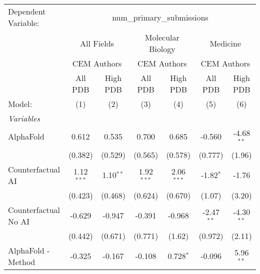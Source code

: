 \begingroup
\centering
\begin{tabular}{lcccccc}
   \tabularnewline \midrule \midrule
   Dependent Variable: & \multicolumn{6}{c}{num\_primary\_submissions}\\
 & \multicolumn{2}{c}{All Fields} & \multicolumn{2}{c}{Molecular Biology} & \multicolumn{2}{c}{Medicine} \\
\cmidrule(lr){2-3} \cmidrule(lr){4-5} \cmidrule(lr){6-7}
 & \multicolumn{2}{c}{CEM Authors} & \multicolumn{2}{c}{CEM Authors} & \multicolumn{2}{c}{CEM Authors} \\
\cmidrule(lr){2-3} \cmidrule(lr){4-5} \cmidrule(lr){6-7}
 & \multicolumn{1}{c}{All PDB} & \multicolumn{1}{c}{High PDB} & \multicolumn{1}{c}{All PDB} & \multicolumn{1}{c}{High PDB} & \multicolumn{1}{c}{All PDB} & \multicolumn{1}{c}{High PDB} \\
\cmidrule(lr){2-2} \cmidrule(lr){3-3} \cmidrule(lr){4-4} \cmidrule(lr){5-5} \cmidrule(lr){6-6} \cmidrule(lr){7-7}
   Model:                                                     & (1)           & (2)           & (3)           & (4)           & (5)          & (6)\\  
   \midrule
   \emph{Variables}\\
   AlphaFold                                                  & 0.612         & 0.535         & 0.700         & 0.685         & -0.560       & -4.68$^{**}$\\   
                                                              & (0.382)       & (0.529)       & (0.565)       & (0.578)       & (0.777)      & (1.96)\\   
   Counterfactual AI                                          & 1.12$^{***}$  & 1.10$^{**}$   & 1.92$^{***}$  & 2.06$^{***}$  & -1.82$^{*}$  & -1.76\\   
                                                              & (0.423)       & (0.468)       & (0.624)       & (0.670)       & (1.07)       & (3.20)\\   
   Counterfactual No AI                                       & -0.629        & -0.947        & -0.391        & -0.968        & -2.47$^{**}$ & -4.30$^{**}$\\   
                                                              & (0.442)       & (0.671)       & (0.771)       & (1.62)        & (0.972)      & (2.11)\\   
   AlphaFold - Method                                         & -0.325        & -0.167        & -0.108        & 0.728$^{*}$   & -0.096       & 5.96$^{**}$\\   

\end{tabular}
